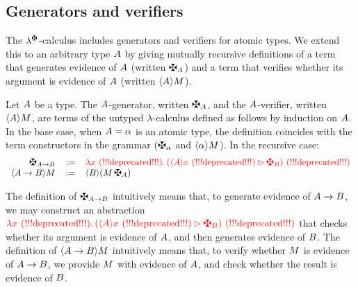 \subsection{Generators and verifiers}

The $\lambdaCheck$-calculus includes generators and verifiers for atomic types.
We extend this to an arbitrary type $A$
by giving mutually recursive definitions of a term that
generates evidence of $A$ (written $\gen{\typ}$)
and a term that verifies whether its argument is evidence of $A$
(written $\langle A\rangle M$).

\begin{definition}
\label{def:generators_and_verifiers}
Let $A$ be a type.
The $A$-generator, written $\gen{\typ}$,
and the $A$-verifier, written $\langle A\rangle M$,
are terms of the untyped $\lambda$-calculus
defined as follows by induction on $A$.
In the base case, when $A = \alpha$ is an atomic type,
the definition coincides with the term constructors in the grammar
($\genbtyp$ and $\langle\alpha\rangle M$).
In the recursive case:
\[
  \begin{array}{rcl}
    \gen{\typ\to\typtwo}
  & \eqdef &
    \lam{\var}{(\eunit{\verif{\typ}{\var}}{\gen{\typtwo}})}
  \\
    \verif{\typ\to\typtwo}{\utm}
  & \eqdef &
    \verif{\typtwo}{(\utm\,\gen{\typ})}
  \end{array}
\]
\end{definition}

The definition of $\gen{\typ\to\typtwo}$ intuitively means that,
to generate evidence of $A\to B$,
we may construct an
abstraction $\lam{\var}{(\eunit{\verif{\typ}{\var}}{\gen{\typtwo}})}$
that checks whether its argument is evidence of $A$,
and then generates evidence of $B$.
The definition of $\langle A\to B\rangle M$ intuitively means that,
to verify whether $M$ is evidence of $A\to B$,
we provide $M$ with evidence of $A$, and check whether the
result is evidence of $B$.

